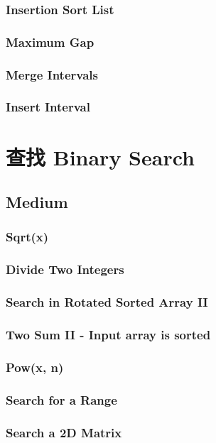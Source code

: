\documentclass[11pt]{book}
\begin{document}
\subsection{Insertion Sort List}
\label{sec-9-2-1}
\subsection{Maximum Gap}
\label{sec-9-2-2}
\subsection{Merge Intervals}
\label{sec-9-2-3}
\subsection{Insert Interval}
\label{sec-9-2-4}

\chapter{查找 Binary Search}
\label{sec-10}
\section{Medium}
\label{sec-10-1}
\subsection{Sqrt(x)}
\label{sec-10-1-1}
\subsection{Divide Two Integers}
\label{sec-10-1-2}
\subsection{Search in Rotated Sorted Array II}
\label{sec-10-1-3}
\subsection{Two Sum II - Input array is sorted}
\label{sec-10-1-4}
\subsection{Pow(x, n)}
\label{sec-10-1-5}
\subsection{Search for a Range}
\label{sec-10-1-6}
\subsection{Search a 2D Matrix}
\label{sec-10-1-7}
\end{document}
